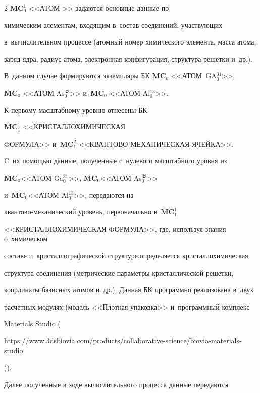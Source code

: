 \begin{multicols}{2}
    $\mathbf{MC}_0^1$ <<АТОМ  >> задаются основные данные по 


химическим элементам, входящим в~состав соединений, участвующих 


в~вы\-чис\-ли\-тель\-ном процессе (атомный номер химического элемента, масса атома, 


заряд ядра, радиус атома, электронная конфигурация, структура решетки и~др.). 


В~данном случае формируются экземпляры БК $\mathbf{MC}_0$ <<АТОМ~GA$_0^{31}$>>, 


$\mathbf{MC}_0$ <<АТОМ As$_0^{33}$>> и~$\mathbf{MC}_0$ <<АТОМ Al$_0^{13}$>>.


     


    К первому масштабному уровню отнесены БК 


    $\mathbf{MC}_1^1$ <<КРИСТАЛЛОХИМИЧЕСКАЯ 


ФОРМУЛА>> и~$\mathbf{MC}_1^2$ <<КВАН\-ТО\-ВО-МЕ\-ХА\-НИ\-ЧЕ\-СКАЯ ЯЧЕЙКА>>. 


C~их по\-мощью данные, полученные с~нулевого масштабного уровня из 


$\mathbf{MC}_0$<<АТОМ Ga$_0^{31}$>>, $\mathbf{MC}_0$<<АТОМ As$_0^{33}$>>


и~$\mathbf{MC}_0$<<АТОМ Al$_0^{13}$>>, передаются на  


кван\-то\-во-ме\-ха\-ни\-че\-ский уровень, первоначально в~$\mathbf{MC}_1^1$ 


<<КРИСТАЛЛОХИМИЧЕСКАЯ ФОРМУЛА>>, где, используя знания о~химическом 


составе и~крис\-тал\-ло\-гра\-фи\-че\-ской структуре,\linebreak определяется крис\-тал\-ло\-хи\-ми\-че\-ская 


структура соединения (мет\-ри\-че\-ские параметры кристалличе\-ской решетки, 


координаты базисных атомов и~др.). Данная БК программно реализована в~двух 


рас\-чет\-ных модулях (модель <<Плотная упаковка>> и~программный комплекс 


Materials Studio ({\sf  


https://www.\linebreak 3dsbiovia.com/products/collaborative-science/biovia-materials-studio})).


    


    Далее полученные в ходе вычислительного процесса данные передаются 



\end{multicols}
